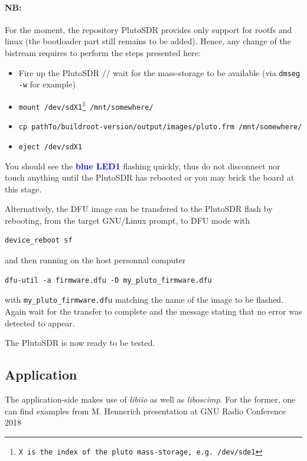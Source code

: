 \documentclass{article}
\begin{document}
\paragraph{NB:} For the moment, the repository PlutoSDR provides only support
for rootfs and linux (the bootloader part still remains to be added). Hence, any
change of the bistream requires to perform the steps presented here:

\begin{itemize}
	\item Fire up the PlutoSDR // wait for the mass-storage to be available (via
{\tt dmseg -w} for example)
	\item {\tt mount /dev/sdX1\footnote{X is the index of the pluto mass-storage, e.g.
/dev/sde1} /mnt/somewhere/}
	\item {\tt cp pathTo/buildroot-version/output/images/pluto.frm /mnt/somewhere/}
	\item {\tt eject /dev/sdX1}  %
\end{itemize}

You should see the {\bf \textcolor{blue}{blue LED1}} flashing quickly, thus do not disconnect
nor touch anything until the PlutoSDR has rebooted or you may brick the board at
this stage. 

Alternatively, the DFU image can be transfered to the PlutoSDR flash by rebooting,
from the target GNU/Linux prompt, to DFU mode with
{\footnotesize
\begin{verbatim}
device_reboot sf
\end{verbatim}
}
and then running on the host personnal computer
{\footnotesize
\begin{verbatim}
dfu-util -a firmware.dfu -D my_pluto_firmware.dfu
\end{verbatim}
}
with {\tt my\_pluto\_firmware.dfu} matching the name of the image to be flashed. Again wait for
the transfer to complete and the message stating that no error was detected to appear.

The PlutoSDR is now ready to be tested.

\subsection{Application}

The application-side makes use of \emph{libiio} as well as \emph{liboscimp}. For
the former, one can find examples from M. Hennerich presentation at GNU Radio
Conference 2018
\end{document}
